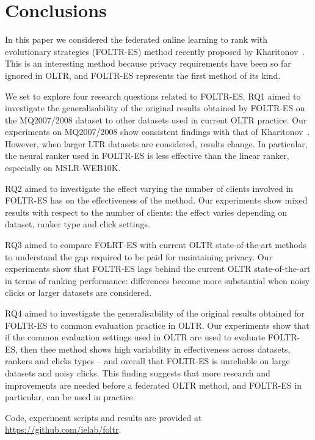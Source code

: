 \section{Conclusions}

In this paper we considered the federated online learning to rank with evolutionary strategies (FOLTR-ES) method recently proposed by Kharitonov~\cite{kharitonov2019federated}. This is an interesting method because privacy requirements have been so far ignored in OLTR, and FOLTR-ES represents the first method of its kind. 

We set to explore four research questions related to FOLTR-ES. RQ1 aimed to investigate the generalisability of the original results obtained by FOLTR-ES on the MQ2007/2008 dataset to other datasets used in current OLTR practice. Our  experiments on MQ2007/2008 show consistent findings with that of Kharitonov~\cite{kharitonov2019federated}. However, when larger LTR datasets are considered, results change. In particular, the neural ranker used in FOLTR-ES is less effective than the linear ranker, especially on MSLR-WEB10K. %

RQ2 aimed to investigate the effect varying the number of clients involved in FOLTR-ES has on the effectiveness of the method. %
Our experiments show mixed results with respect to the number of clients: the effect varies depending on dataset, ranker type and click settings. 

RQ3 aimed to compare FOLRT-ES with current OLTR state-of-the-art methods to understand the gap required to be paid for maintaining privacy. Our experiments show that FOLTR-ES lags behind the current OLTR state-of-the-art in terms of ranking performance: differences become more substantial when noisy clicks or larger datasets are considered. 

RQ4 aimed to investigate the generalisability of the original results obtained for FOLTR-ES to common evaluation practice in OLTR. Our experiments show that if the common evaluation settings used in OLTR are used to evaluate FOLTR-ES, then thee method shows high variability in effectiveness across datasets, rankers and clicks types -- and overall that FOLTR-ES is unreliable on large datasets and noisy clicks. This finding suggests that more research and improvements are needed before a federated OLTR method, and FOLTR-ES in particular, can be used in practice. 

Code, experiment scripts and results are provided at \url{https://github.com/ielab/foltr}. 

